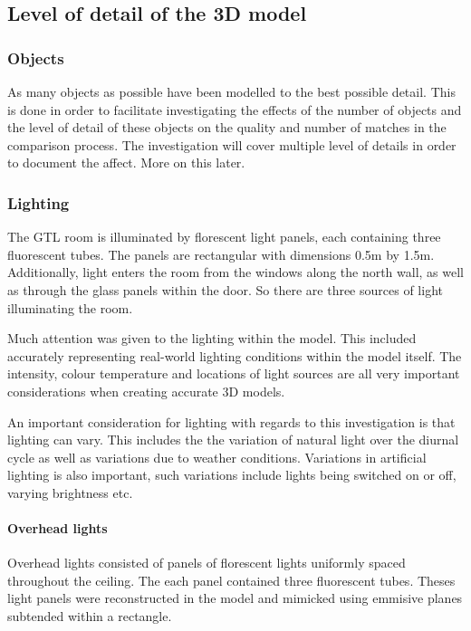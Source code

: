 \documentclass[11pt,a4paper]{report}
\begin{document}
		\subsection{Level of detail of the 3D model}
			\subsubsection{Objects}
				As many objects as possible have been modelled to the best possible detail. This is done in order to facilitate investigating the effects of the number of objects and the level of detail of these objects on the quality and number of matches in the comparison process. The investigation will cover multiple level of details in order to document the affect. More on this later.
				
			\subsubsection{Lighting}
				The GTL room is illuminated by florescent light panels, each containing three fluorescent tubes. The panels are rectangular with dimensions 0.5m by 1.5m. Additionally, light enters the room from the windows along the north wall, as well as through the glass panels within the door. So there are three sources of light illuminating the room.
			
				Much attention was given to the lighting within the model. This included accurately representing real-world lighting conditions within the model itself. The intensity, colour temperature and locations of light sources are all very important considerations when creating accurate 3D models.
				
				An important consideration for lighting with regards to this investigation is that lighting can vary. This includes the the variation of natural light over the diurnal cycle as well as variations due to weather conditions. Variations in artificial lighting is also important, such variations include lights being switched on or off, varying brightness etc.
				
				\paragraph{Overhead lights}
					Overhead lights consisted of panels of florescent lights uniformly spaced throughout the ceiling. The each panel contained three fluorescent tubes. Theses light panels were reconstructed in the model and mimicked using emmisive planes subtended within a rectangle.
					
\end{document}
